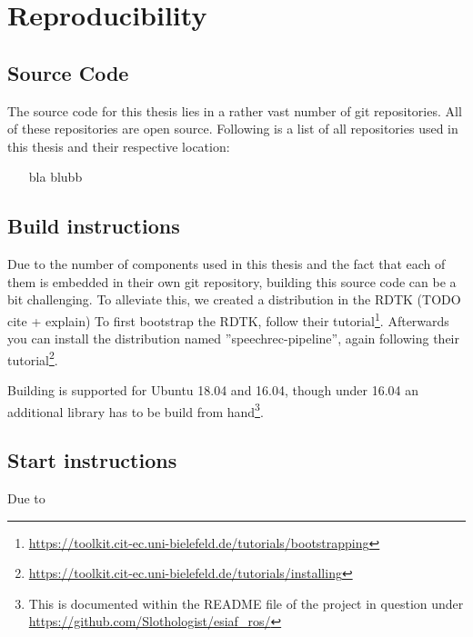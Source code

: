 
\chapter{Reproducibility}

\section{Source Code}
The source code for this thesis lies in a rather vast number of git repositories.
All of these repositories are open source.
Following is a list of all repositories used in this thesis and their respective location:
\begin{itemize}
	\item[bla] blubb
\end{itemize}


\section{Build instructions}
Due to the number of components used in this thesis and the fact that each of them is embedded in their own git repository, building this source code can be a bit challenging.
To alleviate this, we created a distribution in the RDTK (TODO cite + explain)
To first bootstrap the RDTK, follow their tutorial\footnote{\url{https://toolkit.cit-ec.uni-bielefeld.de/tutorials/bootstrapping}}.
Afterwards you can install the distribution named ''speechrec-pipeline'', again following their tutorial\footnote{\url{https://toolkit.cit-ec.uni-bielefeld.de/tutorials/installing}}.


Building is supported for Ubuntu 18.04 and 16.04, though under 16.04 an additional library has to be build from hand\footnote{This is documented within the README file of the project in question under \url{https://github.com/Slothologist/esiaf_ros/}}.


\section{Start instructions}

Due to 